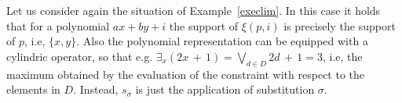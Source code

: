 \documentclass{llncs}
\begin{document}
\begin{example}[Continued...]
	Let us consider again the situation of Example~\ref{execlim}.
	In this case it holds that for a polynomial $ax + by + i$ the support 
	of $\xi(p,i)$ is precisely the support of $p$, i.e, $\{x, y\}$.
	Also the polynomial representation can be equipped with a cylindric operator, so that
	e.g. $\exists_x(2x \, + \, 1) = \bigvee_{d \in D} 2d\, + \, 1 = 3$, i.e,
	the maximum obtained by the evaluation of the constraint with respect 
	to the elements in $D$.
	Instead, $s_\sigma$ is just the application of substitution $\sigma$.
%	
\end{example}
\end{document}
